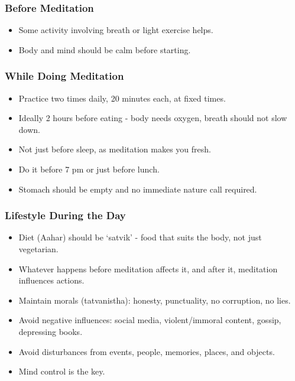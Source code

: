 \begin{frame}[fragile]\frametitle{Before Meditation}
\begin{itemize}
  \item Some activity involving breath or light exercise helps.
  \item Body and mind should be calm before starting.
\end{itemize}
\end{frame}

\begin{frame}[fragile]\frametitle{While Doing Meditation}
\begin{itemize}
  \item Practice two times daily, 20 minutes each, at fixed times.
  \item Ideally 2 hours before eating - body needs oxygen, breath should not slow down.
  \item Not just before sleep, as meditation makes you fresh.
  \item Do it before 7 pm or just before lunch.
  \item Stomach should be empty and no immediate nature call required.
\end{itemize}
\end{frame}

\begin{frame}[fragile]\frametitle{Lifestyle During the Day}
\begin{itemize}
  \item Diet (Aahar) should be ‘satvik’ - food that suits the body, not just vegetarian.
  \item Whatever happens before meditation affects it, and after it, meditation influences actions.
  \item Maintain morals (tatvanistha): honesty, punctuality, no corruption, no lies.
  \item Avoid negative influences: social media, violent/immoral content, gossip, depressing books.
  \item Avoid disturbances from events, people, memories, places, and objects. 
  \item Mind control is the key.
\end{itemize}
\end{frame}

